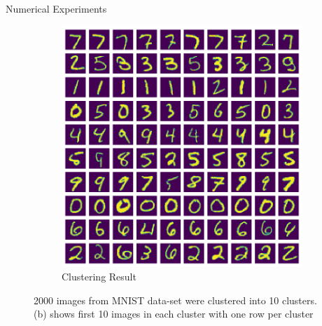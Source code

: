 \documentclass[10pt,a4paper, nocenter]{beamer}
\begin{document}
\begin{frame}{Numerical Experiments}
\begin{figure}[h]
\begin{center}
\begin{subfigure}[b]{0.45\textwidth}
					\includegraphics[width=\textwidth]{../../images/number_clustering_10_hamming.png}
					\caption{Clustering Result}
					\label{fig:clustering_10_hamming}
				\end{subfigure}           
			\end{center}
			\caption{2000 images from MNIST data-set were clustered into 10 clusters. (b) shows first 10 images in each cluster with one row per cluster}
			\label{fig:mnistWImages3}
		\end{figure}
		
	\end{frame}
	
\end{document}
